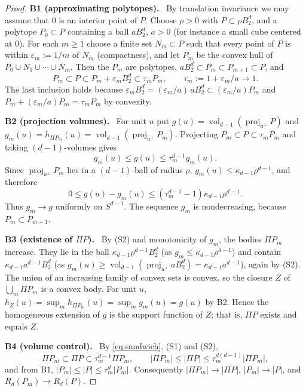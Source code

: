 \documentclass[11pt]{article}
\DeclareMathOperator{\vol}{vol}
\DeclareMathOperator{\proj}{proj}
\newcommand{\step}[1]{\par\smallskip\noindent\textbf{#1}\ }
\begin{document}
\begin{proof}
\step{B1 (approximating polytopes).} By translation invariance we may
assume that \(0\) is an interior point of \(P\). Choose \(\rho>0\) with
\(P\subset\rho B_2^d\), and a polytope \(P_0\subset P\) containing a
ball \(aB_2^d\), \(a>0\) (for instance a small cube centered at \(0\)).
For each \(m\ge1\) choose a finite set \(N_m\subset P\) such that every
point of \(P\) is within \(\varepsilon_m:=1/m\) of \(N_m\)
(compactness), and let \(P_m\) be the convex hull of
\(P_0\cup N_1\cup\cdots\cup N_m\). Then the \(P_m\) are polytopes,
\(aB_2^d\subset P_m\subset P_{m+1}\subset P\), and
\[
 P_m\subset P\subset P_m+\varepsilon_mB_2^d
 \subset\tau_mP_m,
 \qquad \tau_m:=1+\varepsilon_m/a\longrightarrow1 .
\]
The last inclusion holds because
\(\varepsilon_mB_2^d=(\varepsilon_m/a)\,aB_2^d\subset(\varepsilon_m/a)P_m\)
and \(P_m+(\varepsilon_m/a)P_m=\tau_mP_m\) by convexity.

\step{B2 (projection volumes).} For unit \(u\) put
\(g(u)=\vol_{d-1}(\proj_{u^\perp}P)\) and
\(g_m(u)=h_{\Pi P_m}(u)=\vol_{d-1}(\proj_{u^\perp}P_m)\). Projecting
\(P_m\subset P\subset\tau_mP_m\) and taking \((d-1)\)-volumes gives
\begin{equation}\label{eq:sandwich}
 g_m(u)\le g(u)\le\tau_m^{d-1}g_m(u).
\end{equation}
Since \(\proj_{u^\perp}P_m\) lies in a \((d-1)\)-ball of radius
\(\rho\), \(g_m(u)\le\kappa_{d-1}\rho^{d-1}\), and therefore
\[
 0\le g(u)-g_m(u)
 \le (\tau_m^{d-1}-1)\kappa_{d-1}\rho^{d-1}.
\]
Thus \(g_m\to g\) uniformly on \(S^{d-1}\). The sequence \(g_m\) is
nondecreasing, because \(P_m\subset P_{m+1}\).

\step{B3 (existence of \(\Pi P\)).} By (S2) and monotonicity of
\(g_m\), the bodies \(\Pi P_m\) increase. They lie in the ball
\(\kappa_{d-1}\rho^{d-1}B_2^d\) (as \(g_m\le\kappa_{d-1}\rho^{d-1}\))
and contain \(\kappa_{d-1}a^{d-1}B_2^d\) (as
\(g_m(u)\ge\vol_{d-1}(\proj_{u^\perp}aB_2^d)=\kappa_{d-1}a^{d-1}\)),
again by (S2). The union of an increasing family of convex sets is
convex, so the closure \(Z\) of \(\bigcup_m\Pi P_m\) is a convex body.
For unit \(u\),
\(h_Z(u)=\sup_mh_{\Pi P_m}(u)=\sup_mg_m(u)=g(u)\) by B2. Hence the
homogeneous extension of \(g\) is the support function of \(Z\); that
is, \(\Pi P\) exists and equals \(Z\).

\step{B4 (volume control).} By \eqref{eq:sandwich}, (S1) and (S2),
\[
 \Pi P_m\subset\Pi P\subset\tau_m^{d-1}\Pi P_m,
 \qquad
 |\Pi P_m|\le|\Pi P|\le\tau_m^{d(d-1)}|\Pi P_m|,
\]
and from B1, \(|P_m|\le|P|\le\tau_m^d|P_m|\). Consequently
\(|\Pi P_m|\to|\Pi P|\), \(|P_m|\to|P|\), and \(R_d(P_m)\to R_d(P)\).


\end{proof}
\end{document}
